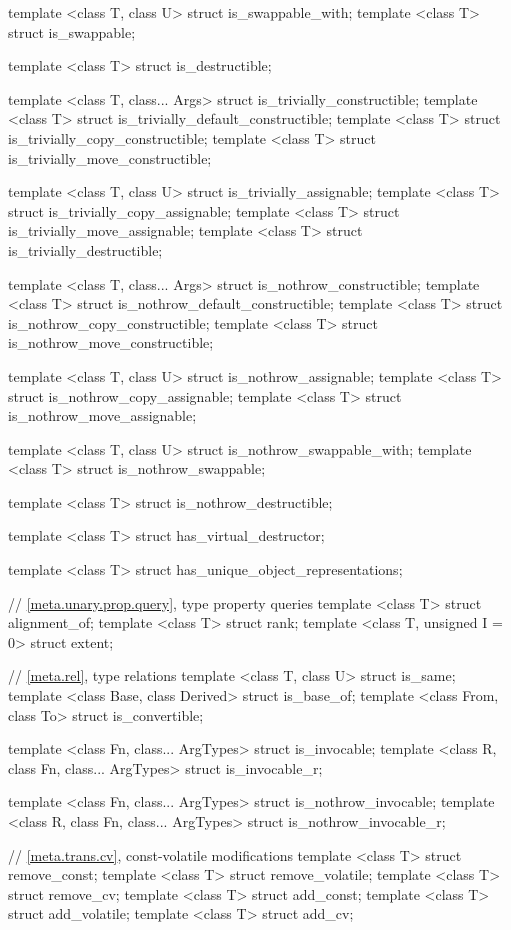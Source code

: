 \begin{codeblock}
{  template <class T, class U> struct is_swappable_with;
  template <class T> struct is_swappable;

  template <class T> struct is_destructible;

  template <class T, class... Args> struct is_trivially_constructible;
  template <class T> struct is_trivially_default_constructible;
  template <class T> struct is_trivially_copy_constructible;
  template <class T> struct is_trivially_move_constructible;

  template <class T, class U> struct is_trivially_assignable;
  template <class T> struct is_trivially_copy_assignable;
  template <class T> struct is_trivially_move_assignable;
  template <class T> struct is_trivially_destructible;

  template <class T, class... Args> struct is_nothrow_constructible;
  template <class T> struct is_nothrow_default_constructible;
  template <class T> struct is_nothrow_copy_constructible;
  template <class T> struct is_nothrow_move_constructible;

  template <class T, class U> struct is_nothrow_assignable;
  template <class T> struct is_nothrow_copy_assignable;
  template <class T> struct is_nothrow_move_assignable;

  template <class T, class U> struct is_nothrow_swappable_with;
  template <class T> struct is_nothrow_swappable;

  template <class T> struct is_nothrow_destructible;

  template <class T> struct has_virtual_destructor;

  template <class T> struct has_unique_object_representations;

  // \ref{meta.unary.prop.query}, type property queries
  template <class T> struct alignment_of;
  template <class T> struct rank;
  template <class T, unsigned I = 0> struct extent;

  // \ref{meta.rel}, type relations
  template <class T, class U> struct is_same;
  template <class Base, class Derived> struct is_base_of;
  template <class From, class To> struct is_convertible;

  template <class Fn, class... ArgTypes> struct is_invocable;
  template <class R, class Fn, class... ArgTypes> struct is_invocable_r;

  template <class Fn, class... ArgTypes> struct is_nothrow_invocable;
  template <class R, class Fn, class... ArgTypes> struct is_nothrow_invocable_r;

  // \ref{meta.trans.cv}, const-volatile modifications
  template <class T> struct remove_const;
  template <class T> struct remove_volatile;
  template <class T> struct remove_cv;
  template <class T> struct add_const;
  template <class T> struct add_volatile;
  template <class T> struct add_cv;

}
\end{codeblock}

